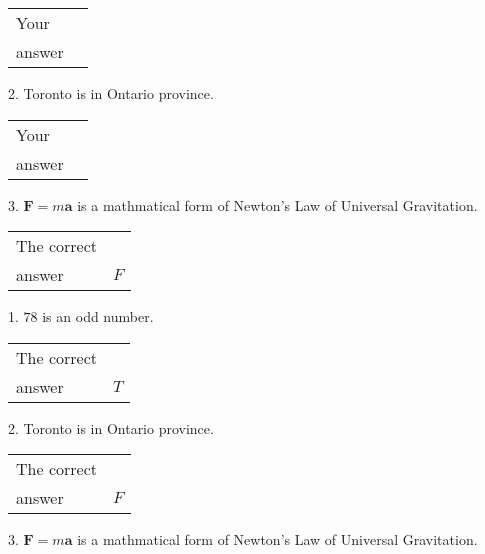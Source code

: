 \documentclass[12pt]{article}
\begin{document}
\noindent\begin{tabular}{|l|l|}\hline Your&\hspace{.2in} \\ answer&\hspace{.2in} \\ \hline \end{tabular}
2.  %
Toronto is in  %
Ontario province.
 
\noindent\begin{tabular}{|l|l|}\hline Your&\hspace{.2in} \\ answer&\hspace{.2in} \\ \hline \end{tabular}
3.  %
$\mathbf{F}=m\mathbf{a}$ is a mathmatical form of
Newton's Law of Universal Gravitation.
 
 
 
\noindent{}
 
 

 
\noindent\begin{tabular}{|l|l|}\hline The correct & \\
          answer &  %
$F$ \\ \hline \end{tabular}
1. $ %
78$ is an  %
odd number.
 
\noindent\begin{tabular}{|l|l|}\hline The correct & \\
          answer &  %
$T$ \\ \hline \end{tabular}
2.  %
Toronto is in  %
Ontario province.
 
\noindent\begin{tabular}{|l|l|}\hline The correct & \\
          answer &  %
$F$ \\ \hline \end{tabular}
3.  %
$\mathbf{F}=m\mathbf{a}$ is a mathmatical form of  %
Newton's Law of Universal Gravitation.
 
 
 
\noindent{}
 
 

 
\vspace{0.3in}
   
   
   
\end{document}
